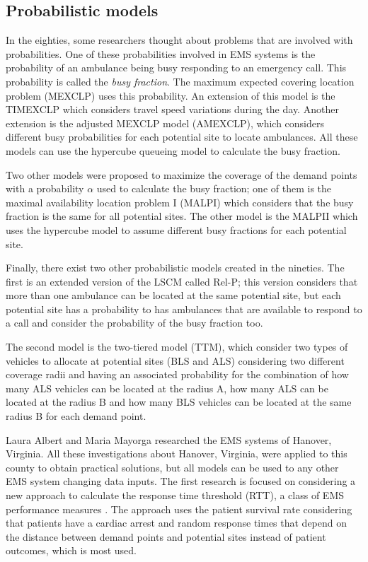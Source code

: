 \subsection{Probabilistic models}

In the eighties, some researchers thought about problems that are involved with probabilities. One of these probabilities involved in EMS systems is the probability of an ambulance being busy responding to an emergency call. This probability is called the \textit{busy fraction}. The maximum expected covering location problem (MEXCLP) uses this probability. An extension of this model is the TIMEXCLP which considers travel speed variations during the day. Another extension is the adjusted MEXCLP model (AMEXCLP), which considers different busy probabilities for each potential site to locate ambulances. All these models can use the hypercube queueing model to calculate the busy fraction\cite{galvao2008emergency}.

Two other models were proposed to maximize the coverage of the demand points with a probability $\alpha$ used to calculate the busy fraction; one of them is the maximal availability location problem I (MALPI) which considers that the busy fraction is the same for all potential sites. The other model is the MALPII which uses the hypercube model to assume different busy fractions for each potential site.

Finally, there exist two other probabilistic models created in the nineties. The first is an extended version of the LSCM called Rel-P; this version considers that more than one ambulance can be located at the same potential site, but each potential site has a probability to has ambulances that are available to respond to a call and consider the probability of the busy fraction too. 

The second model is the two-tiered model (TTM), which consider two types of vehicles to allocate at potential sites (BLS and ALS) considering two different coverage radii and having an associated probability for the combination of how many ALS vehicles can be located at the radius A, how many ALS can be located at the radius B and how many BLS vehicles can be located at the same radius B for each demand point. 

Laura Albert and Maria Mayorga researched the EMS systems of Hanover, Virginia. All these investigations about Hanover, Virginia, were applied to this county to obtain practical solutions, but all models can be used to any other EMS system changing data inputs.
The first research is focused on considering a new approach to calculate the response time threshold (RTT), a class of EMS performance measures \cite{mclay2010evaluating}. The approach uses the patient survival rate considering that patients have a cardiac arrest and random response times that depend on the distance between demand points and potential sites instead of patient outcomes, which is most used. 

